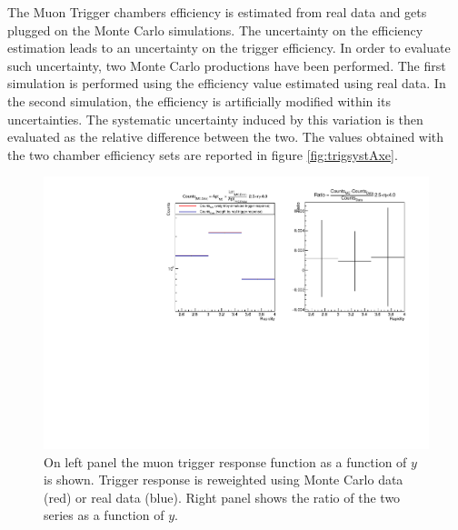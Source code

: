 The Muon Trigger chambers efficiency is estimated from real data and gets plugged on the Monte Carlo simulations.
The uncertainty on the efficiency estimation leads to an uncertainty on the trigger efficiency.
In order to evaluate such uncertainty, two Monte Carlo productions have been performed.
The first simulation is performed using the efficiency value estimated using real data.
In the second simulation, the efficiency is artificially modified within its uncertainties.
The systematic uncertainty induced by this variation is then evaluated as the relative difference between the two.
The values obtained with the two chamber efficiency sets are reported in figure \ref{fig:trigsystAxe}.

\begin{figure}[!htb]
\begin{center}
\includegraphics[width=0.9\linewidth]{Chapters/Analysis/Figs/ResponseFunctionSyst.pdf}
\caption{On left panel the muon trigger response function as a function of $y$ is shown. Trigger response is reweighted using Monte Carlo data (red) or real data (blue). Right panel shows the ratio of the two series as a function of $y$.}
\label{fig:trigsystRF}
\end{center}
\end{figure}

